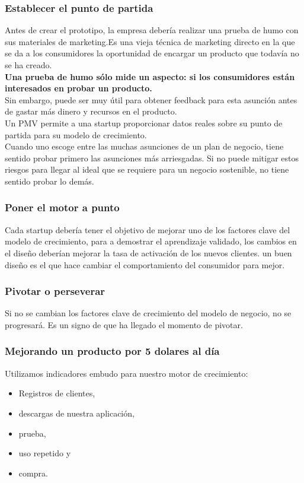 \documentclass[10pt]{article}
\begin{document}
\begin{multicols}{2}
\subsubsection*{Establecer el punto de partida}
{\color{blue}Antes de crear el prototipo, la empresa debería realizar una prueba de humo con sus materiales de marketing.Es una vieja técnica de marketing directo en la que se da a los consumidores la oportunidad de encargar un producto que todavía no se ha creado.}\\
\textbf{Una prueba de humo sólo mide un aspecto: si los consumidores están interesados en probar un producto.}\\
Sin embargo, puede ser muy útil para obtener feedback para esta asunción antes de gastar más dinero y recursos en el producto.\\
Un PMV permite a una startup proporcionar datos reales sobre su punto de partida para su modelo de crecimiento.\\
Cuando uno escoge entre las muchas asunciones de un plan de negocio, tiene sentido probar primero las asunciones más arriesgadas. Si no puede mitigar estos riesgos para llegar al ideal que se requiere para un negocio sostenible, no tiene sentido probar lo demás.
\subsubsection*{Poner el motor a punto}
Cada startup debería tener el objetivo de mejorar uno de los factores clave del modelo de crecimiento, {\color{blue}para a demostrar el aprendizaje validado, los cambios en el diseño deberían mejorar la tasa de activación de los nuevos clientes.  un buen diseño es el que hace cambiar el comportamiento del consumidor para mejor.}
\subsubsection*{Pivotar o perseverar}
Si no se cambian los factores clave de crecimiento del modelo de negocio, no se progresará. Es un signo de que ha llegado el momento de pivotar.
\subsubsection*{Mejorando un producto por 5 dolares al día}
Utilizamos indicadores embudo para nuestro motor de crecimiento:
\begin{itemize}
\item Registros de clientes, 
\item descargas de nuestra aplicación, 
\item prueba, 
\item uso repetido y 
\item compra. 
\end{itemize}

\end{multicols}
\end{document}
